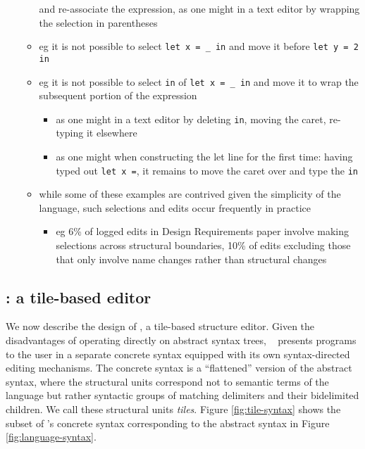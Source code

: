 \begin{itemize}
\begin{itemize}
      and re-associate the expression, as one might in a text editor by
      wrapping the selection in parentheses
    \item eg it is not possible to select \texttt{let x = \_ in} and
      move it before \texttt{let y = 2 in}
    \item eg it is not possible to select \texttt{in} of \texttt{let x = \_ in}
      and move it to wrap the subsequent portion of the expression
    \begin{itemize}
      \item as one might in a text editor by deleting \texttt{in},
        moving the caret, re-typing it elsewhere
      \item as one might when constructing the let line for the first time:
        having typed out \texttt{let x =}, it remains to move the caret over
        and type the \texttt{in}
    \end{itemize}
    \item while some of these examples are contrived given the simplicity of
      the language, such selections and edits occur frequently in practice
    \begin{itemize}
      \item eg 6\% of logged edits in Design Requirements
        paper involve making
        selections across structural boundaries, 10\% of edits excluding those
        that only involve name changes rather than structural changes
    \end{itemize}
  \end{itemize}
\end{itemize}

\subsection{\tylr: a tile-based editor}

We now describe the design of \tylr, a tile-based structure
editor.
Given the disadvantages of operating directly on abstract syntax
trees, \tylr~ presents programs to the user in a separate
concrete syntax equipped with its own syntax-directed editing
mechanisms.
The concrete syntax is a ``flattened'' version of the abstract
syntax, where the structural units correspond not to semantic
terms of the language but rather syntactic groups of matching
delimiters and their bidelimited children.
We call these structural units \emph{tiles}.
Figure \ref{fig:tile-syntax} shows the subset of \tylr's
concrete syntax corresponding to the abstract syntax in
Figure \ref{fig:language-syntax}.

